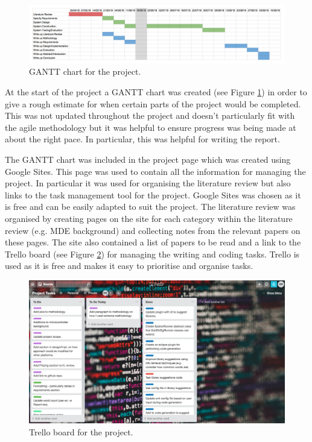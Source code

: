 \documentclass{UoYCSproject}
\begin{document}
\begin{figure}[h!]
  \centering
  \includegraphics[width=0.8\linewidth]{graphics/gantt_chart.png}
  \caption{GANTT chart for the project.}
  \label{fig:gantt_chart}
\end{figure}

At the start of the project a GANTT chart was created (see Figure \ref{fig:gantt_chart}) in order to give a rough estimate for when certain parts of the project would be completed. This was not updated throughout the project and doesn't particularly fit with the agile methodology but it was helpful to ensure progress was being made at about the right pace. In particular, this was helpful for writing the report.

The GANTT chart was included in the project page which was created using Google Sites. This page was used to contain all the information for managing the project. In particular it was used for organising the literature review but also links to the task management tool for the project. Google Sites was chosen as it is free and can be easily adapted to suit the project. The literature review was organised by creating pages on the site for each category within the literature review (e.g. MDE background) and collecting notes from the relevant papers on these pages. The site also contained a list of papers to be read and a link to the Trello board (see Figure \ref{fig:trello}) for managing the writing and coding tasks. Trello is used as it is free and makes it easy to prioritise and organise tasks.

\begin{figure}[h!]
  \centering
  \includegraphics[width=0.8\linewidth]{graphics/trello.png}
  \caption{Trello board for the project.}
  \label{fig:trello}
\end{figure}
\end{document}
